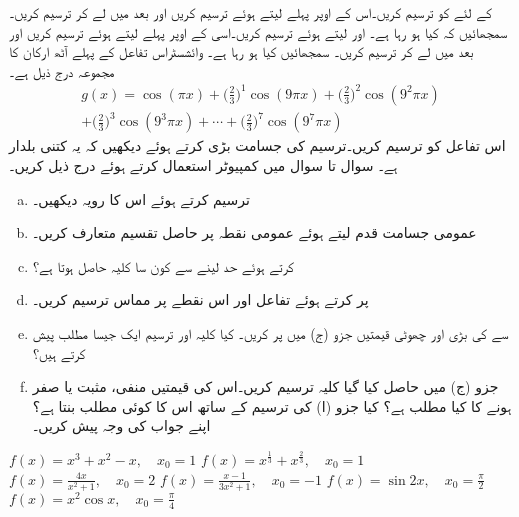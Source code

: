 
 کے لئے  کو ترسیم کریں۔اس کے اوپر پہلے  لیتے ہوئے  ترسیم کریں اور بعد میں  لے کر ترسیم کریں۔سمجھائیں کہ کیا ہو رہا ہے۔
 اور  لیتے ہوئے  ترسیم کریں۔اسی کے اوپر پہلے  لیتے ہوئے  ترسیم کریں اور بعد میں  لے کر ترسیم کریں۔ سمجھائیں کیا ہو رہا ہے۔ 
وائشسٹراس تفاعل  کے پہلے آٹھ ارکان کا مجموعہ درج ذیل ہے۔
\begin{multline*}
g(x)=\cos (\pi x)+\big(\frac{2}{3}\big)^1\cos (9\pi x)+\big(\frac{2}{3}\big)^2\cos (9^2\pi x)\\
+\big(\frac{2}{3}\big)^3\cos (9^3\pi x)+\cdots+\big(\frac{2}{3}\big)^7\cos (9^7\pi x)
\end{multline*}
اس تفاعل کو ترسیم کریں۔ترسیم کی جسامت بڑی کرتے ہوئے دیکھیں کہ یہ کتنی بلدار ہے۔
سوال  تا سوال  میں کمپیوٹر استعمال کرتے ہوئے درج ذیل کریں۔
\begin{enumerate}[a.]
\item
{} ترسیم کرتے ہوئے اس کا رویہ دیکھیں۔
\item
عمومی جسامت قدم  لیتے ہوئے عمومی نقطہ   پر حاصل تقسیم   متعارف کریں۔
\item
{} کرتے ہوئے حد لینے سے کون سا کلیہ حاصل ہوتا ہے؟
\item
{} پر کرتے ہوئے تفاعل اور اس نقطے پر مماس ترسیم کریں۔
\item
{} سے  کی بڑی اور چھوٹی قیمتیں جزو (ج) میں پر کریں۔ کیا کلیہ اور ترسیم ایک جیسا مطلب پیش کرتے ہیں؟
\item
جزو (ج) میں حاصل کیا گیا کلیہ ترسیم کریں۔اس کی قیمتیں منفی، مثبت یا صفر ہونے کا کیا مطلب ہے؟ کیا جزو (ا) کی ترسیم کے ساتھ اس کا کوئی مطلب بنتا ہے؟ اپنے جواب کی وجہ پیش کریں۔
\end{enumerate}

$f(x)=x^3+x^2-x,\quad x_0=1$
$f(x)=x^{\tfrac{1}{3}}+x^{\tfrac{2}{3}},\quad x_0=1$
$f(x)=\tfrac{4x}{x^2+1},\quad x_0=2$
$f(x)=\tfrac{x-1}{3x^2+1},\quad x_0=-1$
$f(x)=\sin 2x,\quad x_0=\tfrac{\pi}{2}$
$f(x)=x^2\cos x,\quad x_0=\tfrac{\pi}{4}$

